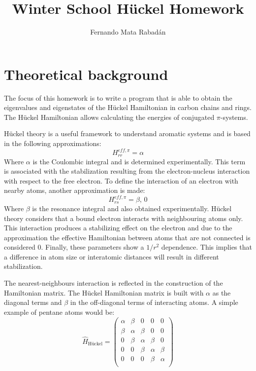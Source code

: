 \documentclass{article}
\title{Winter School Hückel Homework}
\author{Fernando Mata Rabadán}
\date{}
\begin{document}
\maketitle


\section{Theoretical background}
The focus of this homework is to write a program that is able to obtain the eigenvalues and eigenstates of the Hückel Hamiltonian in carbon chains and rings. The Hückel Hamiltonian allows calculating the energies of conjugated $\pi$-systems. 

Hückel theory is a useful framework to understand aromatic systems and is based in the following approximations:
\begin{equation}
    H_{rr}^{eff, \pi} = \alpha
\end{equation}
Where $\alpha$ is the Coulombic integral and is determined experimentally.\cite{bishop1993group} This term is associated with the stabilization resulting from the electron-nucleus interaction with respect to the free electron. To define the interaction of an electron with nearby atoms, another approximation is made: 
\begin{equation}
    H_{rs}^{eff, \pi} = \beta,\,0
\end{equation}
Where $\beta$ is the resonance integral and also obtained experimentally.\cite{bishop1993group} Hückel theory considers that a bound electron interacts with neighbouring atoms only. This interaction produces a stabilizing effect on the electron and due to the approximation the effective Hamiltonian between atoms that are not connected is considered $0$. Finally, these parameters show a \(1/r^2\) dependence. This implies that a difference in atom size or interatomic distances will result in different stabilization. 

The nearest-neighbours interaction is reflected in the  construction of the Hamiltonian matrix. The Hückel Hamiltonian matrix is built with $\alpha$ as the diagonal terms and $\beta$ in the off-diagonal terms of interacting atoms. A simple example of pentane atoms would be: 
\begin{equation}
    \hat{H}_{\textrm{Hückel}}  =
    \begin{pmatrix}
        \alpha & \beta & 0 & 0 & 0 \\
        \beta & \alpha & \beta & 0 & 0 \\
        0 & \beta & \alpha & \beta & 0 \\
        0 & 0 & \beta & \alpha & \beta \\
        0 & 0 & 0 & \beta & \alpha \\
    \end{pmatrix}
\end{equation}
    
\end{document}
